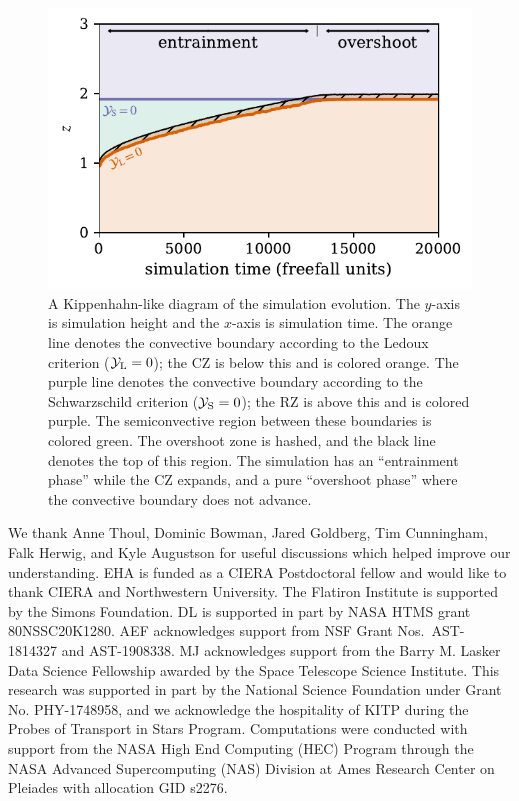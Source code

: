 \documentclass[twocolumn, linenumbers, twocolappendix]{aastex631}
\newcommand{\yL}{\ensuremath{\mathcal{Y}_{\rm{L}}}}
\newcommand{\yS}{\ensuremath{\mathcal{Y}_{\rm{S}}}}
\begin{document}


\begin{figure}[t!]
\centering
\includegraphics[width=\columnwidth]{kippenhahn.pdf}
\caption{
    A Kippenhahn-like diagram of the simulation evolution.
    The $y$-axis is simulation height and the $x$-axis is simulation time.
    The orange line denotes the convective boundary according to the Ledoux criterion ($\yL = 0$); the CZ is below this and is colored orange.
    The purple line denotes the convective boundary according to the Schwarzschild criterion ($\yS = 0$); the RZ is above this and is colored purple.
    The semiconvective region between these boundaries is colored green.
    The overshoot zone is hashed, and the black line denotes the top of this region.
    The simulation has an ``entrainment phase'' while the CZ expands, and a pure ``overshoot phase'' where the convective boundary does not advance.
\label{fig:kippenhahn}
}
\end{figure}




\begin{acknowledgments}
We thank Anne Thoul, Dominic Bowman, Jared Goldberg, Tim Cunningham, Falk Herwig, and Kyle Augustson for useful discussions which helped improve our understanding.
EHA is funded as a CIERA Postdoctoral fellow and would like to thank CIERA and Northwestern University. 
The Flatiron Institute is supported by the Simons Foundation.
DL is supported in part by NASA HTMS grant 80NSSC20K1280.
AEF acknowledges support from NSF Grant Nos.~AST-1814327 and AST-1908338. 
MJ acknowledges support from the Barry M. Lasker Data Science Fellowship awarded by the Space Telescope Science Institute.
This research was supported in part by the National Science Foundation under Grant No. PHY-1748958, and we acknowledge the hospitality of KITP during the Probes of Transport in Stars Program.
Computations were conducted with support from the NASA High End Computing (HEC) Program through the NASA Advanced Supercomputing (NAS) Division at Ames Research Center on Pleiades with allocation GID s2276.
\end{acknowledgments}

\newpage
\appendix





                                                          	



\end{document}
